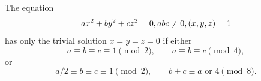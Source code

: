 \begin{proposition}\label{eq:005}
    The equation
\[
    ax^2+by^2+cz^2=0,\\ abc\ne0,\\ (x,y,z)=1
\]
    has only the trivial solution $x=y=z=0$ if either
\[
    a\equiv b\equiv c\equiv1\pmod2,\qquad a\equiv b\equiv c\pmod4,
\]
    or
\[
    a/2\equiv b\equiv c\equiv1\pmod2,\qquad b+c\equiv a\text{ or }4\pmod8.
\]
\end{proposition}
